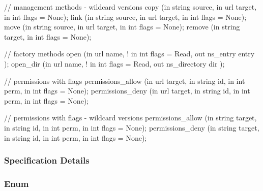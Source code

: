 \begin{myspec}
{{      // management methods - wildcard versions
      copy               (in  string         source,
                          in  url            target,
                          in  int            flags = None);
      link               (in  string         source,
                          in  url            target,
                          in  int            flags = None);
      move               (in  string         source,
                          in  url            target,
                          in  int            flags = None);
      remove             (in  string         target,
                          in  int            flags = None);
 
      // factory methods
      open               (in  url            name,
!                         in  int            flags = Read,
                          out ns_entry       entry   );
      open_dir            (in  url           name,
!                         in  int            flags = Read,
                          out ns_directory   dir     );
 
 
      // permissions with flags
      permissions_allow  (in  url            target,
                          in  string         id,
                          in  int            perm, 
                          in  int            flags = None);
      permissions_deny   (in  url            target,
                          in  string         id,
                          in  int            perm, 
                          in  int            flags = None);
 
      // permissions with flags - wildcard versions
      permissions_allow  (in  string         target,
                          in  string         id,
                          in  int            perm, 
                          in  int            flags = None);
      permissions_deny   (in  string         target,
                          in  string         id,
                          in  int            perm, 
                          in  int            flags = None);
    }
  }
 \end{myspec}
 
 
 \subsubsection{Specification Details}
 
  \subsubsection*{Enum }
 
